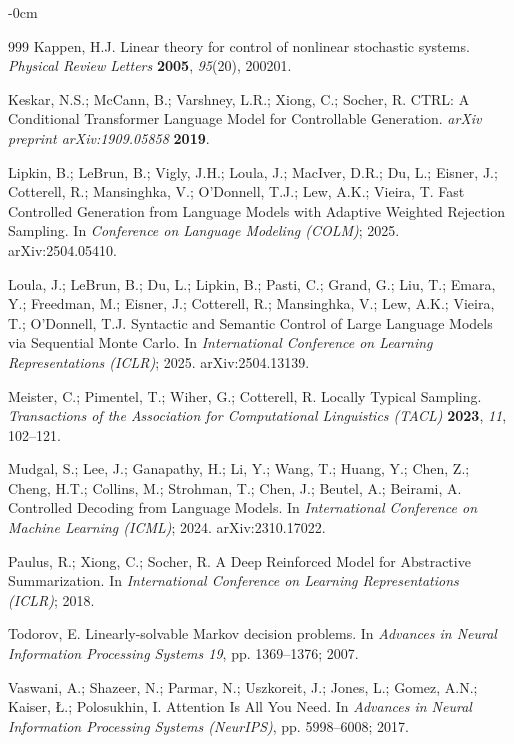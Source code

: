 \documentclass[make,article,submit,pdftex]{Definitions/mdpi}
\begin{document}
\begin{adjustwidth}{-\extralength}{0cm}
\begin{thebibliography}{999}
Kappen, H.J. Linear theory for control of nonlinear stochastic systems. \textit{Physical Review Letters} \textbf{2005}, \textit{95}(20), 200201.

Keskar, N.S.; McCann, B.; Varshney, L.R.; Xiong, C.; Socher, R. {CTRL}: A Conditional Transformer Language Model for Controllable Generation. \textit{arXiv preprint arXiv:1909.05858} \textbf{2019}.

Lipkin, B.; LeBrun, B.; Vigly, J.H.; Loula, J.; MacIver, D.R.; Du, L.; Eisner, J.; Cotterell, R.; Mansinghka, V.; O'Donnell, T.J.; Lew, A.K.; Vieira, T. Fast Controlled Generation from Language Models with Adaptive Weighted Rejection Sampling. In \textit{Conference on Language Modeling (COLM)}; 2025. arXiv:2504.05410.

Loula, J.; LeBrun, B.; Du, L.; Lipkin, B.; Pasti, C.; Grand, G.; Liu, T.; Emara, Y.; Freedman, M.; Eisner, J.; Cotterell, R.; Mansinghka, V.; Lew, A.K.; Vieira, T.; O'Donnell, T.J. Syntactic and Semantic Control of Large Language Models via Sequential Monte Carlo. In \textit{International Conference on Learning Representations (ICLR)}; 2025. arXiv:2504.13139.

Meister, C.; Pimentel, T.; Wiher, G.; Cotterell, R. Locally Typical Sampling. \textit{Transactions of the Association for Computational Linguistics (TACL)} \textbf{2023}, \textit{11}, 102--121.

Mudgal, S.; Lee, J.; Ganapathy, H.; Li, Y.; Wang, T.; Huang, Y.; Chen, Z.; Cheng, H.T.; Collins, M.; Strohman, T.; Chen, J.; Beutel, A.; Beirami, A. Controlled Decoding from Language Models. In \textit{International Conference on Machine Learning (ICML)}; 2024. arXiv:2310.17022.

Paulus, R.; Xiong, C.; Socher, R. A Deep Reinforced Model for Abstractive Summarization. In \textit{International Conference on Learning Representations (ICLR)}; 2018.

Todorov, E. Linearly-solvable {M}arkov decision problems. In \textit{Advances in Neural Information Processing Systems 19}, pp. 1369--1376; 2007.

Vaswani, A.; Shazeer, N.; Parmar, N.; Uszkoreit, J.; Jones, L.; Gomez, A.N.; Kaiser, {\L}.; Polosukhin, I. Attention Is All You Need. In \textit{Advances in Neural Information Processing Systems (NeurIPS)}, pp. 5998--6008; 2017.


\end{thebibliography}
\end{adjustwidth}
\end{document}
